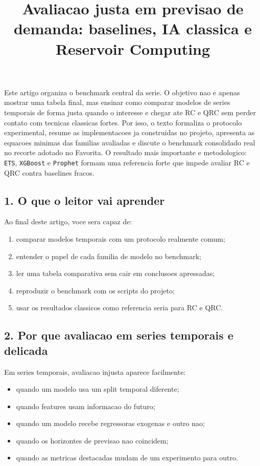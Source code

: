 \documentclass[12pt]{article}
\title{Avaliacao justa em previsao de demanda: baselines, IA classica e Reservoir Computing}
\author{}
\providecommand{\tightlist}{%
          \setlength{\itemsep}{0pt}\setlength{\parskip}{0pt}}
\begin{document}
        \maketitle

        \begin{resumo}
        Este artigo organiza o benchmark central da serie. O objetivo nao e apenas mostrar uma tabela final, mas ensinar como comparar modelos de series temporais de forma justa quando o interesse e chegar ate RC e QRC sem perder contato com tecnicas classicas fortes. Por isso, o texto formaliza o protocolo experimental, resume as implementacoes ja construidas no projeto, apresenta as equacoes minimas das familias avaliadas e discute o benchmark consolidado real no recorte adotado no Favorita. O resultado mais importante e metodologico: \texttt{ETS}, \texttt{XGBoost} e \texttt{Prophet} formam uma referencia forte que impede avaliar RC e QRC contra baselines fracos.
        \end{resumo}

        \subsection{1. O que o leitor vai aprender}\label{1-o-que-o-leitor-vai-aprender}

Ao final deste artigo, voce sera capaz de:

\begin{enumerate}
\def\labelenumi{\arabic{enumi}.}
\tightlist
\item
  comparar modelos temporais com um protocolo realmente comum;
\item
  entender o papel de cada familia de modelo no benchmark;
\item
  ler uma tabela comparativa sem cair em conclusoes apressadas;
\item
  reproduzir o benchmark com os scripts do projeto;
\item
  usar os resultados classicos como referencia seria para RC e QRC.
\end{enumerate}

\subsection{2. Por que avaliacao em series temporais e delicada}\label{2-por-que-avaliacao-em-series-temporais-e-delicada}

Em series temporais, avaliacao injusta aparece facilmente:

\begin{itemize}
\tightlist
\item
  quando um modelo usa um split temporal diferente;
\item
  quando features usam informacao do futuro;
\item
  quando um modelo recebe regressoras exogenas e outro nao;
\item
  quando os horizontes de previsao nao coincidem;
\item
  quando as metricas destacadas mudam de um experimento para outro.
\end{itemize}
\end{document}
